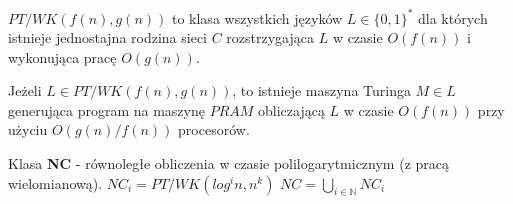 \begin{definicja}
    $PT/WK(f(n), g(n))$ to klasa wszystkich języków $L\in\{0,1\}^*$ dla których istnieje jednostajna rodzina sieci $C$ 
    rozstrzygająca $L$ w czasie $O(f(n))$ i wykonująca pracę $O(g(n))$.
\end{definicja}

\begin{lemat}
    Jeżeli $L\in PT/WK(f(n),g(n))$, to istnieje maszyna Turinga $M\in L$ generująca program na maszynę $PRAM$
    obliczającą $L$ w czasie $O(f(n))$ przy użyciu $O(g(n)/f(n))$ procesorów.
\end{lemat}

\begin{definicja}
    Klasa \textbf{NC} - równoległe obliczenia w czasie polilogarytmicznym (z pracą wielomianową).
    $NC_i = PT/WK(log^in, n^k)$
    $NC = \bigcup_{i\in\mathbb{N}}{NC_i}$
\end{definicja}

